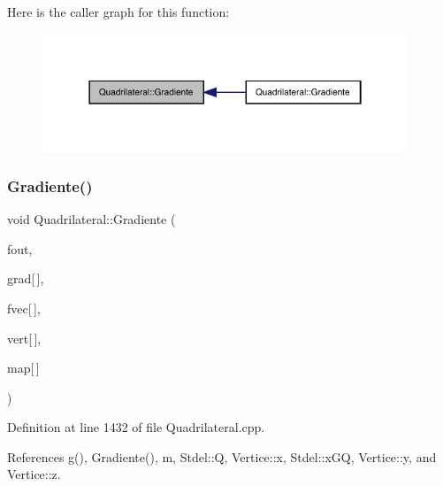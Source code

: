 Here is the caller graph for this function\+:
\nopagebreak
\begin{figure}[H]
\begin{center}
\leavevmode
\includegraphics[width=310pt]{classQuadrilateral_a098f98a40d864e5c6bae4fc96af400ee_icgraph}
\end{center}
\end{figure}
\mbox{\label{classQuadrilateral_a28d6d2bdfb318e828ab1a3471591e602}} 
\subsubsection{\texorpdfstring{Gradiente()}{Gradiente()}\hspace{0.1cm}{\footnotesize\ttfamily [2/6]}}
{\footnotesize\ttfamily void Quadrilateral\+::\+Gradiente (\begin{DoxyParamCaption}\item[{F\+I\+LE $\ast$}]{fout,  }\item[{double $\ast$}]{grad\mbox{[}$\,$\mbox{]},  }\item[{const double}]{fvec\mbox{[}$\,$\mbox{]},  }\item[{const \hyperlink{structVertice}{Vertice}}]{vert\mbox{[}$\,$\mbox{]},  }\item[{const int}]{map\mbox{[}$\,$\mbox{]} }\end{DoxyParamCaption})\hspace{0.3cm}{\ttfamily [virtual]}}



Definition at line 1432 of file Quadrilateral.\+cpp.



References g(), Gradiente(), m, Stdel\+::Q, Vertice\+::x, Stdel\+::x\+GQ, Vertice\+::y, and Vertice\+::z.

